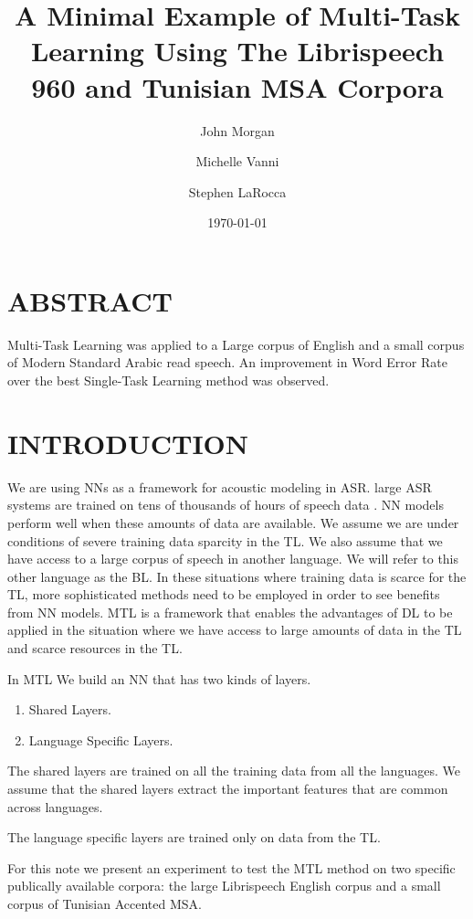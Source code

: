 \documentclass[11pt]{article}
\author{John Morgan \and Michelle Vanni \and Stephen LaRocca }
\date{\today}
\title{A Minimal Example of Multi-Task Learning Using The Librispeech 960 and Tunisian MSA Corpora}
\begin{document}
\maketitle
\tableofcontents


\section{ABSTRACT}
\label{sec-1}
Multi-Task Learning was applied to a Large corpus of English and a small corpus of Modern Standard Arabic  read speech. 
An improvement in Word Error Rate over the best Single-Task Learning method was observed. 
\section{INTRODUCTION}
\label{sec-2}
We are using \gls{NN}s as a framework for acoustic modeling in \gls{ASR}. 
large \gls{ASR} systems are trained on tens of thousands of hours of speech data \cite{Heigold13multilingualacoustic}. 
\gls{NN} models perform well when these amounts of data are available. 
We assume we are under conditions of severe training data sparcity in the \gls{TL}.
We also assume that we have access to a large corpus of speech in another language. 
We will refer to this other language as the \gls{BL}.
In these situations where training data is scarce for the \gls{TL}, more sophisticated methods need to be employed in order to see benefits from \gls{NN} models. 
\gls{MTL}\cite{Caruana93multitasklearning:} is a framework that enables the advantages of \gls{DL} to be applied in the situation where we have access to large amounts of data in the \gls{TL} and scarce   resources in the \gls{TL}.  

In \gls{MTL} We build an \gls{NN} that has two kinds of layers.
\begin{enumerate}
\item Shared Layers.
\item Language Specific Layers.
\end{enumerate}

The shared layers are trained on all the training data from all the languages.
We assume that the shared layers extract the important features that are common across languages. 

The language specific layers are trained only on data from the \gls{TL}.

For this note we present an experiment to test the \gls{MTL} method on two specific publically available corpora: the large Librispeech English corpus and a small corpus of Tunisian Accented \gls{MSA}. 
\end{document}
